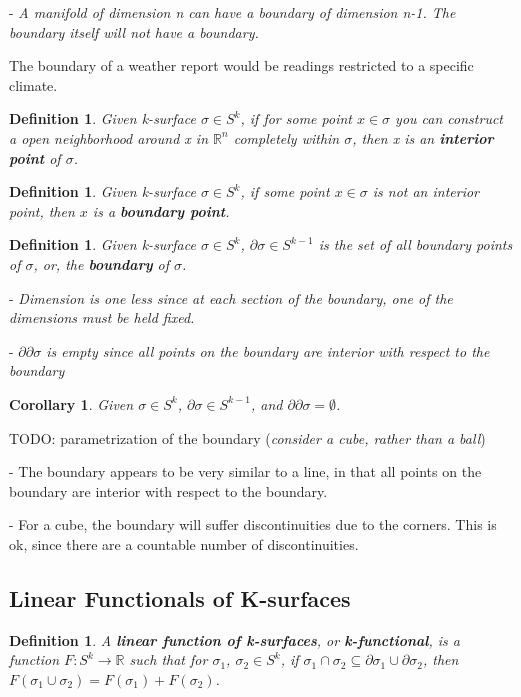 \documentclass{book}
\newtheorem{defn}[equation]{Definition}
\newtheorem{coro}[equation]{Corollary}
\begin{document}
- \emph{A manifold of dimension n can have a boundary of dimension n-1. The boundary itself will not have a boundary.}

The boundary of a weather report would be readings restricted to a specific climate. 


\begin{defn}
	Given k-surface $\sigma \in S^k$, if for some point $x \in \sigma$ you can construct a open neighborhood around x in $\mathbb{R}^n$ completely within $\sigma$, then x is an \textbf{interior point} of $\sigma$. 
\end{defn}

\begin{defn}
	Given k-surface $\sigma \in S^k$, if some point $x \in \sigma$ is not an interior point, then $x$ is a \textbf{boundary point}.
\end{defn}

\begin{defn}
	Given k-surface $\sigma \in S^k$, $\partial\sigma \in S^{k-1}$ is the set of all boundary points of $\sigma$, or, the \textbf{boundary} of $\sigma$. 
\end{defn}

- \emph{Dimension is one less since at each section of the boundary, one of the dimensions must be held fixed. }

- \emph{$\partial\partial\sigma$ is empty since all points on the boundary are interior with respect to the boundary}


\begin{coro}
	Given $\sigma \in S^k$, $\partial\sigma \in S^{k-1}$, and $\partial\partial\sigma = \emptyset$. 
\end{coro}

TODO: parametrization of the boundary (\emph{consider a cube, rather than a ball})

- The boundary appears to be very similar to a line, in that all points on the boundary are interior with respect to the boundary. 

- For a cube, the boundary will suffer discontinuities due to the corners. This is ok, since there are a countable number of discontinuities. 

\subsection{Linear Functionals of K-surfaces}


\begin{defn}
	A \textbf{linear function of k-surfaces}, or \textbf{k-functional}, is a function $F : S^k \to \mathbb{R}$ such that for $\sigma_1$, $\sigma_2 \in S^k$, if $\sigma_1 \cap \sigma_2 \subseteq \partial\sigma_1 \cup \partial\sigma_2$, then $F(\sigma_1\cup\sigma_2) = F(\sigma_1) + F(\sigma_2)$. 
\end{defn}
\end{document}
